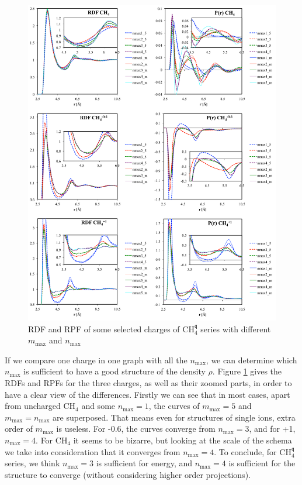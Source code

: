 \begin{figure}[!th]
\begin{centering}
\includegraphics[width=1\columnwidth]{_figure/results/ch4_series}
\par\end{centering}
\caption{\acs{RDF} and \acs{RPF} of some selected charges of $\mathrm{C}\mathrm{H}_{4}^{\mathfrak{q}}$
series with different $m_{\max}$ and $n_{\max}$\label{fig:RDF-and-polarization}}
\end{figure}

If we compare one charge in one graph with all the $n_{\max}$, we
can determine which $n_{\max}$ is sufficient to have a good structure
of the density $\rho$. Figure \ref{fig:RDF-and-polarization} gives
the \acs{RDF}s and \acs{RPF}s for the three charges, as well as
their zoomed parts, in order to have a clear view of the differences.
Firstly we can see that in most cases, apart from uncharged
$\mathrm{C}\mathrm{H}_{4}$ and some $n_{\max}=1$, the curves of
$m_{\max}=5$ and $m_{\max}=n_{\max}$ are superposed. That means
even for structures of single ions, extra order of $m_{\max}$ is useless.
For -0.6, the curves converge from $n_{\max}=3$, and for +1, $n_{\max}=4$.
For $\mathrm{C}\mathrm{H}_{4}$ it seems to be bizarre, but looking
at the scale of the schema we take into consideration that it converges from
$n_{\max}=4$. To conclude, for $\mathrm{C}\mathrm{H}_{4}^{\mathfrak{q}}$
series, we think $n_{\max}=3$ is sufficient for energy, and $n_{\max}=4$
is sufficient for the structure to converge (without considering higher
order projections).

